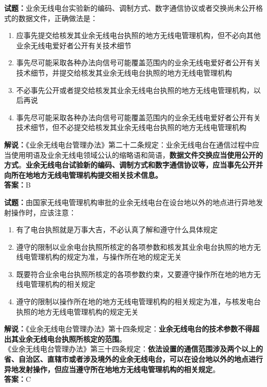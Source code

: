 \documentclass{ctexbook}
\begin{document}
\vspace{\baselineskip}

\noindent\textbf{试题：}业余无线电台实验新的编码、调制方式、数字通信协议或者交换尚未公开格式的数据文件，正确做法是：
\begin{enumerate}[leftmargin=3em]
  \item 应事先提交给核发其业余无线电台执照的地方无线电管理机构，但不必向其他业余无线电爱好者公开有关技术细节
  \item 事先尽可能采取各种办法向信号可能覆盖范围内的业余无线电爱好者公开有关技术细节，并提交给核发其业余无线电台执照的地方无线电管理机构
  \item 不必事先公开或者提交给核发其业余无线电台执照的地方无线电管理机构，以后再说
  \item 事先尽可能采取各种办法向信号可能覆盖范围内的业余无线电爱好者公开有关技术细节，但不必提交给核发其业余无线电台执照的地方无线电管理机构
\end{enumerate}
\noindent\textbf{解说：}《业余无线电台管理办法》第二十二条规定：业余无线电台在通信过程中应当使用明语及业余无线电领域公认的缩略语和简语，\textbf{数据文件交换应当使用公开的方式}。\textbf{业余无线电台试验新的编码、调制方式和数字通信协议等，应当事先公开并向所在地地方无线电管理机构提交相关技术信息。}\\\noindent\textbf{答案：}B

\vspace{\baselineskip}

\noindent\textbf{试题：}由国家无线电管理机构审批的业余无线电台在设台地以外的地点进行异地发射操作时，应该注意：
\begin{enumerate}[leftmargin=3em]
  \item 有了电台执照就是万事大吉，不必认真了解和遵守什么具体规定
  \item 遵守的限制以业余电台执照所核定的各项参数和核发其业余电台执照的地方无线电管理机构的规定为准，与操作所在地的规定无关
  \item 既要符合业余电台执照所核定的各项参数约束，又要遵守操作所在地的地方无线电管理机构的相关规定
  \item 遵守的限制以操作所在地的地方无线电管理机构的相关规定为准，与核发电台执照的地方无线电管理机构的规定无关
\end{enumerate}
\noindent\textbf{解说：}《业余无线电台管理办法》第十四条规定：\textbf{业余无线电台的技术参数不得超出其业余无线电台执照所核定的范围}。\\
《业余无线电台管理办法》第三十四条规定：\textbf{依法设置的通信范围涉及两个以上的省、自治区、直辖市或者涉及境外的业余无线电台，可以在设台地以外的地点进行异地发射操作，但应当遵守所在地地方无线电管理机构的相关规定}。\\\noindent\textbf{答案：}C
\end{document}
